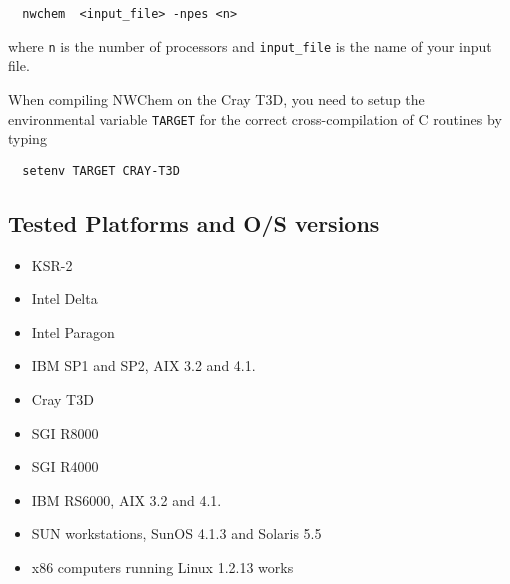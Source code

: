 \begin{verbatim}
  nwchem  <input_file> -npes <n>
\end{verbatim}

where \verb+n+ is the number of processors and \verb+input_file+ is the
name of your input file.

When compiling NWChem on the Cray T3D, you need to setup the
environmental variable {\tt TARGET} for the correct cross-compilation
of C routines by typing
\begin{verbatim}
  setenv TARGET CRAY-T3D
\end{verbatim}

\subsection{Tested Platforms and O/S versions}

\begin{itemize}
\item KSR-2 
\item Intel Delta 
\item Intel Paragon 
\item IBM SP1 and SP2, AIX 3.2 and 4.1.
\item Cray T3D
\item SGI R8000
\item SGI R4000
\item IBM RS6000, AIX 3.2 and 4.1.
\item SUN workstations, SunOS 4.1.3 and Solaris 5.5
\item x86 computers running Linux 1.2.13 works
\end{itemize}
